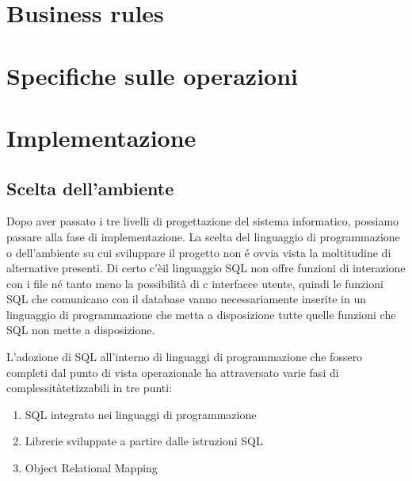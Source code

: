 \documentclass[12pt,a4paper,onecolumn]{article}
\begin{document}
\section{Business rules}

\section{Specifiche sulle operazioni}
\newpage

\section{Implementazione}
	\subsection{Scelta dell'ambiente}
	\begin{flushleft}
		Dopo aver passato i tre livelli di progettazione del sistema informatico, possiamo passare alla fase di implementazione. La scelta del linguaggio di programmazione o dell'ambiente su cui sviluppare il progetto non \'{e} ovvia vista la moltitudine di alternative presenti. \newline
		Di certo c'èil linguaggio SQL non offre funzioni di interazione con i file n\'{e} tanto meno la possibilità di c interfacce utente, quindi le funzioni SQL che comunicano con il database vanno necessariamente inserite in un linguaggio di programmazione che metta a disposizione tutte quelle funzioni che SQL non mette a disposizione.\newline
		
		L'adozione di SQL all'interno di linguaggi di programmazione che fossero completi dal punto di vista operazionale ha attraversato varie fasi di complessitàtetizzabili in tre punti:
	\end{flushleft}
	\begin{enumerate}
		\item SQL integrato nei linguaggi di programmazione
		\item Librerie sviluppate a partire dalle istruzioni SQL
		\item Object Relational Mapping
	\end{enumerate}
\end{document}

